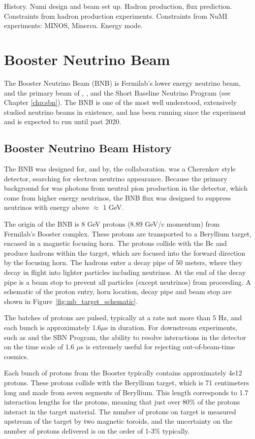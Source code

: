 History. Numi design and beam set up.  Hadron production, flux prediction.  Constraints from hadron production experiments.  Constraints from NuMI experiments: MINOS, Miner$\nu$a.  Energy mode.

\section{Booster Neutrino Beam}
\label{sec:bnb}

The Booster Neutrino Beam (BNB) is Fermilab's lower energy neutrino beam, and the primary beam of \MB, \uboone, and the Short Baseline Neutrino Program (see Chapter \ref{chp:sbn}).  The BNB is one of the most well understood, extensively studied neutrino beams in existence, and has been running since the \MB experiment and is expected to run until past 2020.

\subsection{Booster Neutrino Beam History}
The BNB was designed for, and by, the \MB collaboration.  \MB was a Cherenkov style detector, searching for electron neutrino appearance.  Because the primary background for \MB was photons from neutral pion production in the detector, which come from higher energy neutrinos, the BNB flux was designed to suppress neutrinos with energy above $\approx$ 1 GeV.

The origin of the BNB is 8 GeV protons (8.89 GeV/c momentum) from Fermilab's Booster complex.  These protons are transported to a Beryllium target, encased in a magnetic focusing horn.  The protons collide with the Be and produce hadrons within the target, which are focused into the forward direction by the focusing horn.  The hadrons enter a decay pipe of 50 meters, where they decay in flight into lighter particles including neutrinos.  At the end of the decay pipe is a beam stop to prevent all particles (except neutrinos) from proceeding.  A schematic of the proton entry, horn location, decay pipe and beam stop are shown in Figure~\ref{fig:mb_target_schematic}.

The batches of protons are pulsed, typically at a rate  not more than 5 Hz, and each bunch is approximately 1.6$\mu$s in duration.  For downstream experiments, such as \MB and the SBN Program, the ability to resolve interactions in the detector on the time scale of 1.6 $\mu$s is extremely useful for rejecting out-of-beam-time cosmics.  

Each bunch of protons from the Booster typically contains approximately 4e12 protons.  These protons collide with the Beryllium target, which is 71 centimeters long and made from seven segments of Beryllium.  This length corresponds to 1.7 interaction lengths for the protons, meaning that just over 80\% of the protons interact in the target material.  The number of protons on target is measured upstream of the target by two magnetic toroids, and the uncertainty on the number of protons delivered is on the order of 1-3\% typically.

